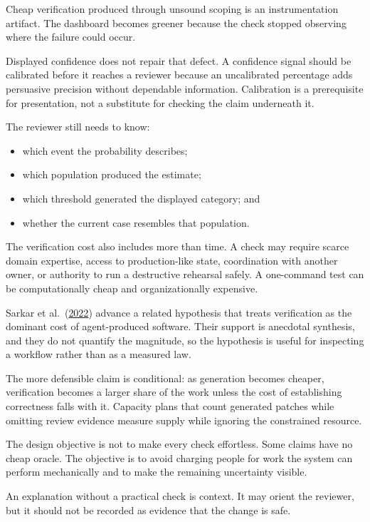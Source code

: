 Cheap verification produced through unsound scoping is an instrumentation artifact. The dashboard becomes greener because the check stopped observing where the failure could occur.

Displayed confidence does not repair that defect. A confidence signal should be calibrated before it reaches a reviewer because an uncalibrated percentage adds persuasive precision without dependable information. Calibration is a prerequisite for presentation, not a substitute for checking the claim underneath it.


The reviewer still needs to know:

\begin{itemize}
\tightlist
\item
  which event the probability describes;
\item
  which population produced the estimate;
\item
  which threshold generated the displayed category; and
\item
  whether the current case resembles that population.
\end{itemize}

The verification cost also includes more than time. A check may require scarce domain expertise, access to production-like state, coordination with another owner, or authority to run a destructive rehearsal safely. A one-command test can be computationally cheap and organizationally expensive.

Sarkar et al.~(\href{https://arxiv.org/abs/2208.06213}{2022}) advance a related hypothesis that treats verification as the dominant cost of agent-produced software. Their support is anecdotal synthesis, and they do not quantify the magnitude, so the hypothesis is useful for inspecting a workflow rather than as a measured law.

The more defensible claim is conditional: as generation becomes cheaper, verification becomes a larger share of the work unless the cost of establishing correctness falls with it. Capacity plans that count generated patches while omitting review evidence measure supply while ignoring the constrained resource.

The design objective is not to make every check effortless. Some claims have no cheap oracle. The objective is to avoid charging people for work the system can perform mechanically and to make the remaining uncertainty visible.

An explanation without a practical check is context. It may orient the reviewer, but it should not be recorded as evidence that the change is safe.


